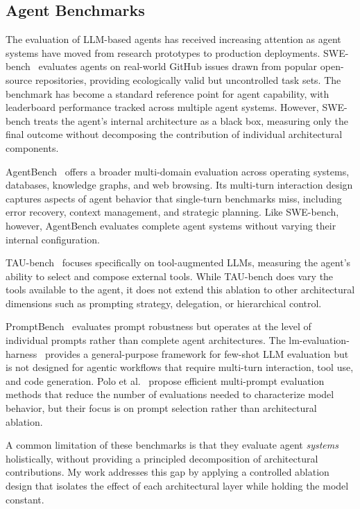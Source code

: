 \documentclass[11pt]{article}
\begin{document}
\subsection{Agent Benchmarks}
\label{sec:agent_benchmarks}

The evaluation of LLM-based agents has received increasing attention as agent
systems have moved from research prototypes to production deployments.
SWE-bench~\cite{jimenez2024swebench} evaluates agents on real-world GitHub
issues drawn from popular open-source repositories, providing ecologically
valid but uncontrolled task sets. The benchmark has become a standard reference
point for agent capability, with leaderboard performance tracked across
multiple agent systems. However, SWE-bench treats the agent's internal
architecture as a black box, measuring only the final outcome without
decomposing the contribution of individual architectural components.

AgentBench~\cite{liu2023agentbench} offers a broader multi-domain evaluation
across operating systems, databases, knowledge graphs, and web browsing. Its
multi-turn interaction design captures aspects of agent behavior that
single-turn benchmarks miss, including error recovery, context management, and
strategic planning. Like SWE-bench, however, AgentBench evaluates complete
agent systems without varying their internal configuration.

TAU-bench~\cite{yao2024taubench} focuses specifically on tool-augmented LLMs,
measuring the agent's ability to select and compose external tools. While
TAU-bench does vary the tools available to the agent, it does not extend this
ablation to other architectural dimensions such as prompting strategy,
delegation, or hierarchical control.

PromptBench~\cite{zhu2024promptbench} evaluates prompt robustness but operates
at the level of individual prompts rather than complete agent architectures.
The lm-evaluation-harness~\cite{gao2024lmevalharness} provides a
general-purpose framework for few-shot LLM evaluation but is not designed for
agentic workflows that require multi-turn interaction, tool use, and code
generation. Polo et al.~\cite{polo2024efficient} propose efficient
multi-prompt evaluation methods that reduce the number of evaluations needed
to characterize model behavior, but their focus is on prompt selection rather
than architectural ablation.

A common limitation of these benchmarks is that they evaluate agent
\emph{systems} holistically, without providing a principled decomposition of
architectural contributions. My work addresses this gap by applying a
controlled ablation design that isolates the effect of each architectural layer
while holding the model constant.
\end{document}
